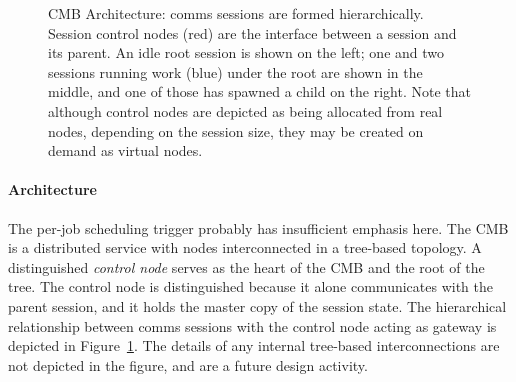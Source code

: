 \begin{figure}
\begin{minipage}[b]{0.2\linewidth}
\end{minipage}
\hspace{0.5cm}
\begin{minipage}[b]{0.2\linewidth}
\end{minipage}
\hspace{0.5cm}
\begin{minipage}[b]{0.2\linewidth}
\end{minipage}
\hspace{0.5cm}
\begin{minipage}[b]{0.2\linewidth}
\end{minipage}
\caption{CMB Architecture:  comms sessions are formed hierarchically.
Session control nodes (red) are the interface between a session and its parent.
An idle root session is shown on the left; one and two sessions running 
work (blue) under the root are shown in the middle, and one of those has
spawned a child on the right.  Note that although control nodes are depicted
as being allocated from real nodes, depending on the session size, they may
be created on demand as virtual nodes.}
\label{FigCommsEx1}
\end{figure}

\paragraph{Architecture}
\ifcomments
{}
\fi
The per-job scheduling trigger probably has insufficient emphasis here.
The CMB is a distributed service with nodes interconnected in a tree-based
topology.
A distinguished {\em control node} serves as the heart of the CMB
and the root of the tree.
The control node is distinguished because it alone communicates with
the parent session, and it holds the master copy of the session state.
The hierarchical relationship between comms sessions with the control
node acting as gateway is depicted in Figure~\ref{FigCommsEx1}.
The details of any internal tree-based interconnections
are not depicted in the figure, and are a future design activity.

